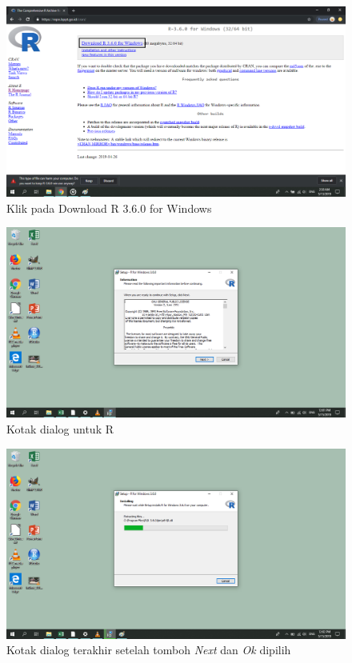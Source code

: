 \documentclass[]{book}
\begin{document}
\begin{figure}
\centering
\includegraphics{Gambar/r-download/09.png}
\caption{\label{fig:install-r-3}Klik pada Download R 3.6.0 for Windows}
\end{figure}

\begin{figure}
\centering
\includegraphics{Gambar/r-download/10.png}
\caption{\label{fig:install-r-4}Kotak dialog untuk R}
\end{figure}

\begin{figure}
\centering
\includegraphics{Gambar/r-download/11.png}
\caption{\label{fig:install-r-5}Kotak dialog terakhir setelah tomboh
\emph{Next} dan \emph{Ok} dipilih}
\end{figure}
\end{document}
